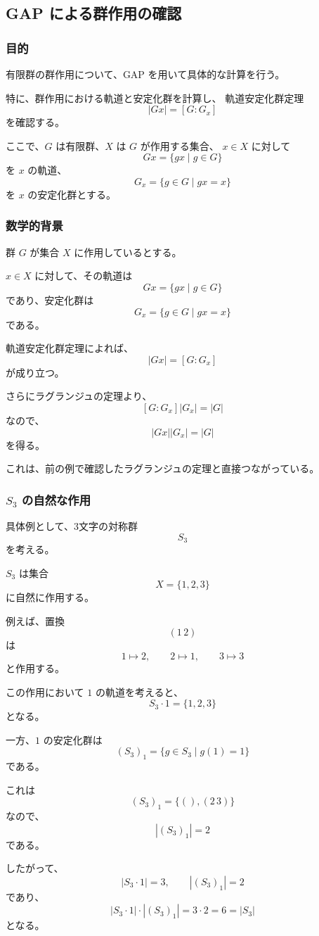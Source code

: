 \subsection{GAP による群作用の確認}

\subsubsection{目的}

有限群の群作用について、GAP を用いて具体的な計算を行う。

特に、群作用における軌道と安定化群を計算し、
軌道安定化群定理
\[
|Gx|=[G:G_x]
\]
を確認する。

ここで、$G$ は有限群、$X$ は $G$ が作用する集合、
$x\in X$ に対して
\[
Gx=\{gx\mid g\in G\}
\]
を $x$ の軌道、
\[
G_x=\{g\in G\mid gx=x\}
\]
を $x$ の安定化群とする。

\subsubsection{数学的背景}

群 $G$ が集合 $X$ に作用しているとする。

$x\in X$ に対して、その軌道は
\[
Gx=\{gx\mid g\in G\}
\]
であり、安定化群は
\[
G_x=\{g\in G\mid gx=x\}
\]
である。

軌道安定化群定理によれば、
\[
|Gx|=[G:G_x]
\]
が成り立つ。

さらにラグランジュの定理より、
\[
[G:G_x]|G_x|=|G|
\]
なので、
\[
|Gx||G_x|=|G|
\]
を得る。

これは、前の例で確認したラグランジュの定理と直接つながっている。

\subsubsection{$S_3$ の自然な作用}

具体例として、3文字の対称群
\[
S_3
\]
を考える。

$S_3$ は集合
\[
X=\{1,2,3\}
\]
に自然に作用する。

例えば、置換
\[
(1\,2)
\]
は
\[
1\mapsto2,\qquad
2\mapsto1,\qquad
3\mapsto3
\]
と作用する。

この作用において $1$ の軌道を考えると、
\[
S_3\cdot1=\{1,2,3\}
\]
となる。

一方、$1$ の安定化群は
\[
(S_3)_1
=
\{g\in S_3\mid g(1)=1\}
\]
である。

これは
\[
(S_3)_1=\{(),(2\,3)\}
\]
なので、
\[
|(S_3)_1|=2
\]
である。

したがって、
\[
|S_3\cdot1|=3,\qquad
|(S_3)_1|=2
\]
であり、
\[
|S_3\cdot1|\cdot|(S_3)_1|
=3\cdot2
=6
=|S_3|
\]
となる。


